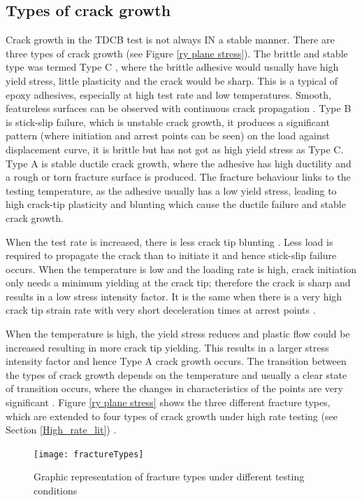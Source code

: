 \documentclass[numbers=noendperiod,chapterprefix=on]{icldt} %
\begin{document}
\subsection{Types of crack growth}
Crack growth in the TDCB test is not always IN a stable manner. There are three types of crack growth (see Figure \ref{ry plane stress}). The brittle and stable type was termed Type C \cite{Lee2006}, where the brittle adhesive would usually have high yield stress, little plasticity and the crack would be sharp. This is a typical of epoxy adhesives, especially at high test rate and low temperatures. Smooth, featureless surfaces can be observed with continuous crack propagation \cite{Bandyopadhyay1990a}.  Type B is stick-slip failure, which is unstable crack growth, it produces a significant pattern (where initiation and arrest points can be seen) on the load against displacement curve, it is brittle but has not got as high yield stress as Type C. Type A is stable ductile crack growth, where the adhesive has high ductility and a rough or torn fracture surface is produced. The fracture behaviour links to the testing temperature, as the adhesive usually has a low yield stress, leading to high crack-tip plasticity and blunting which cause the ductile failure and stable crack growth. 

When the test rate is increased, there is less crack tip blunting \cite{Kinloch1994}. Less load is required to propagate the crack than to initiate it and hence stick-slip failure occurs. When the temperature is low and the loading rate is high, crack initiation only needs a minimum yielding at the crack tip; therefore the crack is sharp and results in a low stress intensity factor. It is the same when there is a very high crack tip strain rate with very short deceleration times at arrest points \cite{Hsieh2011}. 

When the temperature is high, the yield stress reduces and plastic flow could be increased resulting in more crack tip yielding. This results in a larger stress intensity factor \cite{Hsieh2011} and hence Type A crack growth occurs. The transition between the types of crack growth depends on the temperature and usually a clear state of transition occurs, where the changes in characteristics of the points are very significant \cite{Hsieh2011,Kinloch1994}.
Figure \ref{ry plane stress} shows the three different fracture types, which are extended to four types of crack growth under high rate testing (see Section \ref{High_rate_lit}) \cite{Adnan2008}.

\begin{figure}[!htpb]
\centering
\texttt{[image: fractureTypes]}
\caption{Graphic representation of fracture types under different testing conditions \cite{Lee2006}}
\end{figure}
\FloatBarrier
\end{document}
